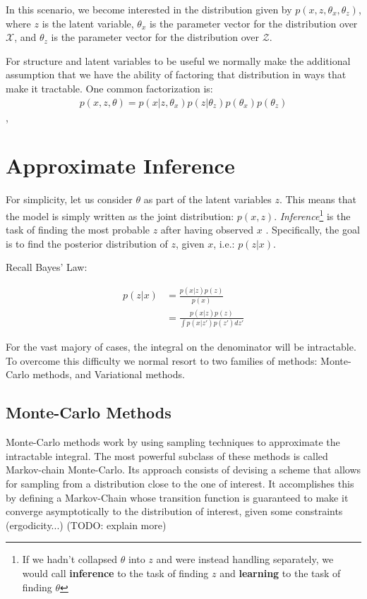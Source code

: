 In this scenario, we become interested in the distribution given by
$p(x, z, \theta_x, \theta_z)$, where $z$ is the latent variable, $\theta_x$ is
the parameter vector for the distribution over $\mathcal{X}$, and $\theta_z$ is
the parameter vector for the distribution over $\mathcal{Z}$.

For structure and latent variables to be useful we normally make the additional
assumption that we have the ability of factoring that distribution in ways that
make it tractable. One common factorization is:
\begin{align}
    p(x, z, \theta) = p(x| z, \theta_x) p(z | \theta_z) p(\theta_x) p(\theta_z)
\end{align},

\section{Approximate Inference}
\label{section:probmodelinf}
For simplicity, let us consider $\theta$ as part of the latent variables $z$.
This means that the model is simply written as the joint distribution: $p(x, z)$.
\emph{Inference}\footnote{If we hadn't collapsed $\theta$ into $z$ and were instead handling
separately, we would call \textbf{inference} to the task of finding $z$ and
\textbf{learning} to the task of finding $\theta$} is the task of finding the 
most probable $z$ after having observed $x$ . Specifically, the goal is
to find the posterior distribution of $z$, given $x$, i.e.: $p(z|x)$.

Recall Bayes' Law:

\begin{align}
    p(z|x) &= \frac{p(x|z)p(z)}{p(x)} \\
           &= \frac{p(x|z)p(z)}{\int p(x|z')p(z') dz'}
\end{align}

For the vast majory of cases, the integral on the denominator will be
intractable. To overcome this difficulty we normal resort to two families
of methods: Monte-Carlo methods, and Variational methods.

\subsection{Monte-Carlo Methods}
\label{subsection:mcmc}

Monte-Carlo methods work by using sampling techniques to approximate the
intractable integral. The most powerful subclass of these methods is called
Markov-chain Monte-Carlo. Its approach consists of devising a scheme that
allows for sampling from a distribution close to the one of interest. It
accomplishes this by defining a Markov-Chain whose transition function 
is guaranteed to make it converge asymptotically to the distribution of interest,
given some constraints (ergodicity...) (TODO: explain more)

